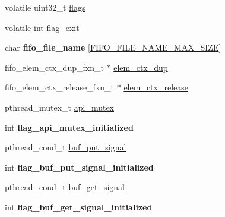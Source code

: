 \begin{DoxyCompactItemize}
\item 
volatile uint32\+\_\+t \hyperlink{structfifo__ctx__s_a6c86ce21bbd7a84d164d9c5ecf72ac3a}{flags}
\item 
volatile int \hyperlink{structfifo__ctx__s_a4856c98e4576bd328ff3ee4063b1421a}{flag\+\_\+exit}
\item 
char {\bfseries fifo\+\_\+file\+\_\+name} \mbox{[}\hyperlink{fifo_8c_a42708bf618db9ea973b091a2d5bdfa9e}{F\+I\+F\+O\+\_\+\+F\+I\+L\+E\+\_\+\+N\+A\+M\+E\+\_\+\+M\+A\+X\+\_\+\+S\+I\+ZE}\mbox{]}\hypertarget{structfifo__ctx__s_ad94e9742a0fe4eff3cd6bbc9501ca872}{}\label{structfifo__ctx__s_ad94e9742a0fe4eff3cd6bbc9501ca872}

\item 
fifo\+\_\+elem\+\_\+ctx\+\_\+dup\+\_\+fxn\+\_\+t $\ast$ \hyperlink{structfifo__ctx__s_a29fe5cab2bded769f7aff0050877aa65}{elem\+\_\+ctx\+\_\+dup}
\item 
fifo\+\_\+elem\+\_\+ctx\+\_\+release\+\_\+fxn\+\_\+t $\ast$ \hyperlink{structfifo__ctx__s_a5d110b8cfb21fe7f732ba5efc0013d59}{elem\+\_\+ctx\+\_\+release}
\item 
pthread\+\_\+mutex\+\_\+t \hyperlink{structfifo__ctx__s_a27be272ae3fa045dfb5e64778a484725}{api\+\_\+mutex}
\item 
int {\bfseries flag\+\_\+api\+\_\+mutex\+\_\+initialized}\hypertarget{structfifo__ctx__s_a4c003f60d37a471dc9f5bf517df52608}{}\label{structfifo__ctx__s_a4c003f60d37a471dc9f5bf517df52608}

\item 
pthread\+\_\+cond\+\_\+t \hyperlink{structfifo__ctx__s_a3f9e6f9e1505a9f7e1756c212602a9df}{buf\+\_\+put\+\_\+signal}
\item 
int {\bfseries flag\+\_\+buf\+\_\+put\+\_\+signal\+\_\+initialized}\hypertarget{structfifo__ctx__s_adb6724f4e6b09980696d3e71440b8804}{}\label{structfifo__ctx__s_adb6724f4e6b09980696d3e71440b8804}

\item 
pthread\+\_\+cond\+\_\+t \hyperlink{structfifo__ctx__s_af13501e5f83d5d1561bf76577c490f23}{buf\+\_\+get\+\_\+signal}
\item 
int {\bfseries flag\+\_\+buf\+\_\+get\+\_\+signal\+\_\+initialized}\hypertarget{structfifo__ctx__s_af1ee1332ce2af0a6bd6e77e7e99c4ca1}{}\label{structfifo__ctx__s_af1ee1332ce2af0a6bd6e77e7e99c4ca1}


\end{DoxyCompactItemize}
